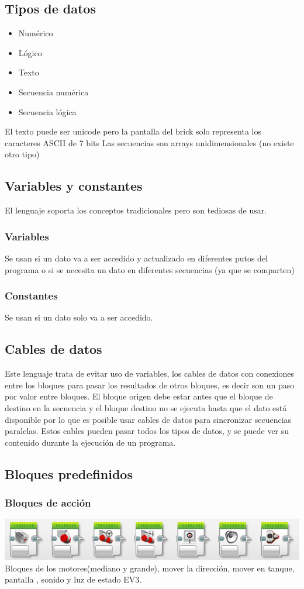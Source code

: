 \documentclass[12pt,a4paper]{article}
\begin{document}
\subsection{Tipos de datos}
\begin{itemize}
\item Numérico
\item Lógico
\item Texto
\item Secuencia numérica
\item Secuencia lógica
\end{itemize}
El texto puede ser unicode pero la pantalla del brick solo representa los caracteres ASCII de 7 bits
Las secuencias son arrays unidimensionales (no existe otro tipo)
\subsection{Variables y constantes}
El lenguaje soporta los conceptos tradicionales pero son tediosas de usar.
\subsubsection{Variables}
Se usan si un dato va a ser accedido y actualizado en diferentes putos del programa o si se necesita un dato en diferentes secuencias (ya que se comparten)
\subsubsection{Constantes}
Se usan si un dato solo va a ser accedido.
\subsection{Cables de datos}
Este lenguaje trata de evitar uso de variables, los cables de datos con conexiones entre los bloques para pasar los resultados de otros bloques, es decir son un paso por valor entre bloques. El bloque origen debe estar antes que el bloque de destino en la secuencia y el bloque destino no se ejecuta hasta que el dato está disponible por lo que es posible usar cables de datos para sincronizar secuencias paralelas. Estos cables pueden pasar todos los tipos de datos, y se puede ver su contenido durante la ejecución de un programa.
\subsection{Bloques predefinidos}
\subsubsection{Bloques de acción}
\includegraphics[scale=0.5]{acciones.PNG}
Bloques de los motores(mediano y grande), mover la dirección, mover en tanque, pantalla , sonido y luz de estado EV3.
\end{document}
